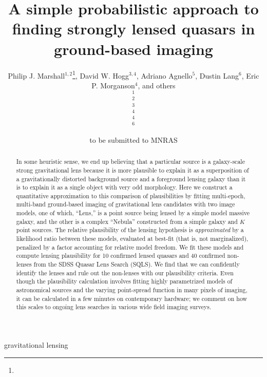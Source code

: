 \documentclass[useAMS,usenatbib]{mn2e}
\title[Finding lensed quasars]
{A simple probabilistic approach to finding 
strongly lensed quasars in ground-based imaging}
\author[]{%
  Philip J. Marshall$^{1,2}$\thanks{\pjmemail},
  David W. Hogg$^{3,4}$,
  Adriano Agnello$^{5}$,
  Dustin Lang$^{6}$,
  Eric P. Morganson$^{4}$,
  and others 
  \medskip\\
  $^1$\kipac\\
  $^2$\oxford\\
  $^3$\nyu\\
  $^4$\mpia\\
  $^4$\ucsb\\
  $^6$\cmu
}
\begin{document}
             
\date{to be submitted to MNRAS}
             
\pagerange{\pageref{firstpage}--\pageref{lastpage}}

\maketitle           

\label{firstpage}


\begin{abstract}
In some heuristic sense, we end up believing that a particular source
is a galaxy-scale strong gravitational lens because it is more
plausible to explain it as a superposition of a gravitationally
distorted background source and a foreground lensing galaxy than it is
to explain it as a single object with very odd morphology.  Here we
construct a quantitative approximation to this comparison of
plausibilities by fitting multi-epoch, multi-band ground-based imaging
of gravitational lens candidates with two image models, one of which, ``Lens,''
is a point source being lensed by a simple model massive galaxy, and the
other is a complex ``Nebula'' constructed from a simple galaxy and $K$
point sources.  The relative plausibility of the lensing hypothesis is
\emph{approximated} by a likelihood ratio between these models, evaluated at
best-fit (that is, not marginalized), penalized by a factor accounting
for relative model freedom.  We fit these models and compute lensing
plausibility for 
10 confirmed lensed quasars and 40 confirmed non-lenses from the SDSS Quasar Lens
Search (SQLS).
We find that we can confidently identify the lenses and rule out the
non-lenses with our plausibility criteria.  Even though the plausibility
calculation involves fitting highly parametrized models of
astronomical sources and the varying point-spread function in many
pixels of imaging, it can be calculated in 
a few minutes on contemporary
hardware; we comment on how this scales to ongoing lens searches in various wide
field imaging surveys.
\end{abstract}


\begin{keywords}
  gravitational lensing
\end{keywords}
\end{document}
